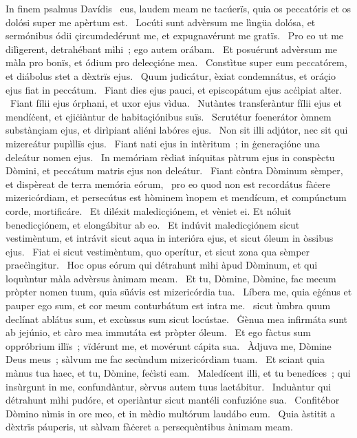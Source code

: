 { In finem psalmus Davídis}
{%
~eus, laudem meam ne tacúerïs, quia os peccatóris et os dolósi super me apèrtum est. 
~Locúti sunt advèrsum me lìngüa dolósa, et sermónibus ódii çircumdedérunt me, et expugnavérunt me gratïs. 
~Pro eo ut me dilìgerent, detrahébant mìhi~; ego autem orábam. 
~Et posuérunt advèrsum me màla pro bonïs, et ódium pro delecçióne mea. 
~Constìtue super eum peccatórem, et diábolus stet a dèxtrïs ejus. 
~Quum judicátur, èxiat condemnátus, et oráçio ejus fiat in peccátum. 
~Fiant dies ejus pauci, et episcopátum ejus acċìpiat alter. 
~Fiant fílii ejus órphani, et uxor ejus vìdua. 
~Nutàntes transferàntur fílii ejus et mendíċent, et ejiċiàntur de habitaçiónibus suïs. 
~Scrutétur foenerátor òmnem substànçiam ejus, et dirìpiant aliéni labóres ejus. 
~Non sit illi adjútor, nec sit qui mizereátur pupìllïs ejus. 
~Fiant nati ejus in intèritum~; in ġeneraçióne una deleátur nomen ejus. 
~In memóriam rèdiat iníquitas pàtrum ejus in conspèctu Dòmini, et peccátum matris ejus non deleátur. 
~Fiant còntra Dòminum sèmper, et dispèreat de terra memória eórum, 
~pro eo quod non est recordátus fàċere mizericórdiam, et persecútus est hòminem ìnopem et mendícum, et compúnctum corde, mortificáre. 
~Et diléxit maledicçiónem, et vèniet ei. Et nóluit benedicçiónem, et elongábitur ab eo. 
~Et indúvit maledicçiónem sicut vestimèntum, et intrávit sicut aqua in interióra ejus, et sicut óleum in òssibus ejus. 
~Fiat ei sicut vestimèntum, quo operítur, et sicut zona qua sèmper praeċìngitur. 
~Hoc opus eórum qui détrahunt mìhi àpud Dòminum, et qui loquùntur màla advèrsus ànimam meam. 
~Et tu, Dòmine, Dòmine, fac mecum pròpter nomen tuum, quia süávis est mizericórdia tua. 
~Líbera me, quia eġénus et pauper ego sum, et cor meum conturbátum est intra me. 
~sicut ùmbra quum declínat ablátus sum, et excùssus sum sicut locústae. 
~Ġènua mea infirmáta sunt ab jejúnio, et càro mea immutáta est pròpter óleum. 
~Et ego fàctus sum oppróbrium illïs~; vïdérunt me, et movérunt cápita sua. 
~Àdjuva me, Dòmine Deus meus~; sàlvum me fac secùndum mizericórdiam tuam. 
~Et sciant quia mànus tua haec, et tu, Dòmine, feċìsti eam. 
~Maledícent illi, et tu benedíces~; qui insùrgunt in me, confundàntur, sèrvus autem tuus laetábitur. 
~Induàntur qui détrahunt mìhi pudóre, et operiàntur sicut mantéli confuzióne sua. 
~Confitébor Dòmino nìmis in ore meo, et in mèdio multórum laudábo eum. 
~Quia àstitit a dèxtrïs páuperis, ut sàlvam fàċeret a persequèntibus ànimam meam. 
}
